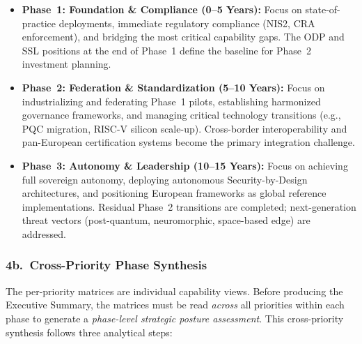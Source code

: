 \documentclass{ieeeaccess}
\begin{document}
\begin{itemize}
    \item \textbf{Phase~1: Foundation \& Compliance (0--5 Years):}
    Focus on state-of-practice deployments, immediate regulatory compliance
    (NIS2, CRA enforcement), and bridging the most critical capability gaps.
    The ODP and SSL positions at the end of Phase~1 define the baseline for
    Phase~2 investment planning.

    \item \textbf{Phase~2: Federation \& Standardization (5--10 Years):}
    Focus on industrializing and federating Phase~1 pilots, establishing
    harmonized governance frameworks, and managing critical technology
    transitions (e.g., PQC migration, RISC-V silicon scale-up). Cross-border
    interoperability and pan-European certification systems become the primary
    integration challenge.

    \item \textbf{Phase~3: Autonomy \& Leadership (10--15 Years):}
    Focus on achieving full sovereign autonomy, deploying autonomous
    Security-by-Design architectures, and positioning European frameworks as
    global reference implementations. Residual Phase~2 transitions are
    completed; next-generation threat vectors (post-quantum, neuromorphic,
    space-based edge) are addressed.
\end{itemize}

\subsubsection*{4b.\ Cross-Priority Phase Synthesis}
The per-priority matrices are individual capability views. Before producing
the Executive Summary, the matrices must be read \emph{across} all priorities
within each phase to generate a \emph{phase-level strategic posture
assessment}. This cross-priority synthesis follows three analytical steps:
\end{document}

